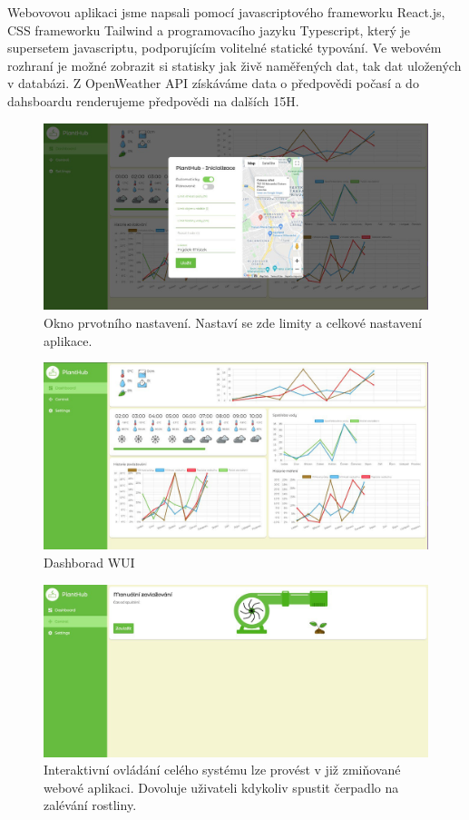\documentclass[11pt,a4paper]{article}
\begin{document}
Webovovou aplikaci jsme napsali pomocí javascriptového frameworku
React.js, CSS frameworku
Tailwind a programovacího jazyku Typescript, který je supersetem javascriptu,
podporujícím volitelné statické typování. Ve webovém rozhraní je možné zobrazit
si statisky jak živě
naměřených dat, tak dat uložených v databázi. Z OpenWeather API získáváme data
o předpovědi počasí a do dahsboardu renderujeme předpovědi na dalších 15H.

\begin{figure}[h]
	\centering
	\includegraphics[width=0.9\linewidth]{ui-inicializace.jpg}
	\caption{Okno prvotního nastavení. Nastaví se zde limity a celkové
		nastavení aplikace.}
\end{figure}

\begin{figure}[h]
	\centering
	\includegraphics[width=0.9\linewidth]{web-ui.png}
	\caption{Dashborad WUI}
\end{figure}

\begin{figure}[h]
	\centering
	\includegraphics[width=0.9\linewidth]{web-ui-pump.png}
	\caption{Interaktivní ovládání celého systému lze provést v již
		zmiňované webové aplikaci. Dovoluje uživateli kdykoliv spustit
		čerpadlo na
		zalévání rostliny.}
\end{figure}
\end{document}
